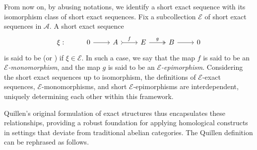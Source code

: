 From now on, by abusing notations, we identify a short exact sequence with its isomorphism class of short exact sequences. Fix a subcollection $\mathcal{E}$ of short exact sequences in $\mathscr{A}$. A short exact sequence \[\begin{tikzcd}
	\xi: & 0 & A & E & B &  0
	\arrow[from=1-2, to=1-3]
	\arrow["f",tail, from=1-3, to=1-4]
	\arrow["g",two heads,from=1-4, to=1-5]
	\arrow[from=1-5, to=1-6]
\end{tikzcd} \] is said to be  (or ) if $\xi \in \mathcal{E}$. In such a case, we say that the map $f$ is said to be an \emph{$\mathcal{E}$-monomorphism}, and the map $g$ is said to be an \emph{$\mathcal{E}$-epimorphism}. Considering the short exact sequences up to isomorphism, the definitions of $\mathcal{E}$-exact sequences, $\mathcal{E}$-monomorphisms, and short $\mathcal{E}$-epimorphisms are interdependent, uniquely determining each other within this framework.

Quillen’s original formulation of exact structures thus encapsulates these relationships, providing a robust foundation for applying homological constructs in settings that deviate from traditional abelian categories. The Quillen definition can be rephrased as follows.


